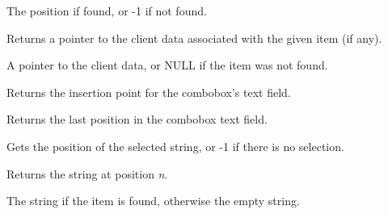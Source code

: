 


The position if found, or -1 if not found.

\label{wxcomboboxgetclientdata}


Returns a pointer to the client data associated with the given item (if any).




A pointer to the client data, or NULL if the item was not found.

\label{wxcomboboxgetinsertionpoint}


Returns the insertion point for the combobox's text field.

\label{wxcomboboxgetlastposition}


Returns the last position in the combobox text field.

\label{wxcomboboxgetselection}


Gets the position of the selected string, or -1 if there is no selection.

\label{wxcomboboxgetstring}


Returns the string at position {\it n}.




The string if the item is found, otherwise the empty string.

\label{wxcomboboxgetstringselection}


